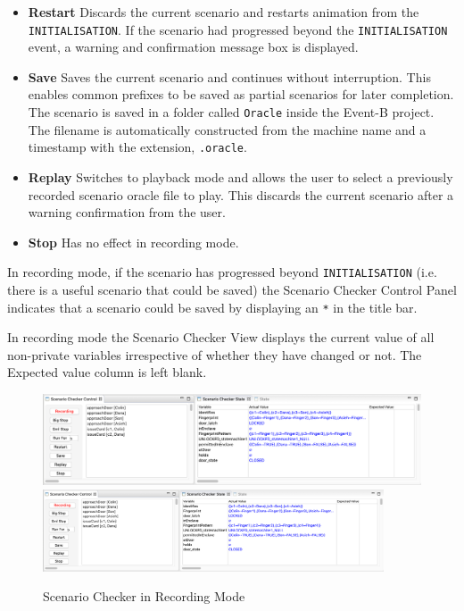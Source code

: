 \begin{itemize}
	\item \textbf{Restart}  Discards the current scenario and restarts animation from the \texttt{INITIALISATION}. If the scenario had progressed beyond the \texttt{INITIALISATION} event, a warning and confirmation message box is displayed.
	\item \textbf{Save}  Saves the current scenario and continues without interruption. This enables common prefixes to be saved as partial scenarios for later completion. The scenario is saved in a folder called \texttt{Oracle} inside the Event-B project. The filename is automatically constructed from the machine name and a timestamp with the extension, \texttt{.oracle}.
	\item \textbf{Replay}  Switches to playback mode and allows the user to select a previously recorded scenario oracle file to play. This discards the current scenario after a warning confirmation from the user.
	\item \textbf{Stop}  Has no effect in recording mode.
\end{itemize}

In recording mode, if the scenario has progressed beyond \texttt{INITIALISATION} (i.e. there is a useful scenario that could be saved) the Scenario Checker Control Panel indicates that a scenario could be saved by displaying an \texttt{*} in the title bar.

In recording mode the Scenario Checker View displays the current value of all non-private variables irrespective of whether they have changed or not.
The Expected value column is left blank.

\begin{figure}[!htbp]
	\centering
	\ifplastex
	\includegraphics[width=900]{figures/recording}
	\else
	\includegraphics[width=0.9\textwidth]{figures/recording}
	\fi
	\caption{Scenario Checker in Recording Mode}
	\label{fig:recording}
\end{figure}

